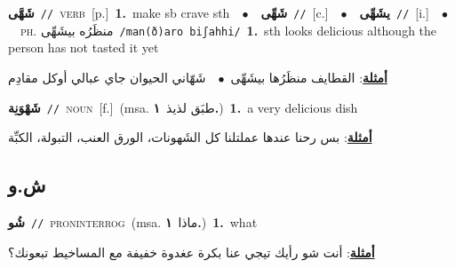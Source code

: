 \documentclass[10pt,a4paper,twoside]{article} %
\begin{document}
\begin{multicols}{2}
{\setlength\topsep{0pt}\textbf{\foreignlanguage{arabic}{شَهَّى}}\ {\color{gray}\texttt{//}\color{black}}\ \textsc{verb}\ [p.]\ \textbf{1.}~make sb crave sth\ \ $\bullet$\ \ \setlength\topsep{0pt}\textbf{\foreignlanguage{arabic}{شَهِّى}}\ {\color{gray}\texttt{//}\color{black}}\ [c.]\ \ $\bullet$\ \ \setlength\topsep{0pt}\textbf{\foreignlanguage{arabic}{يشَهِّى}}\ {\color{gray}\texttt{//}\color{black}}\ [i.]\ \ $\bullet$\ \ \textsc{ph.} \color{gray} \foreignlanguage{arabic}{منظَرُه بيشَهِّى}\color{black}\ {\color{gray}\texttt{/{\sffamily man(ð)aro biʃahhi}/}\color{black}}\ \textbf{1.}~sth looks delicious although the person has not tasted it yet\  \begin{flushright}\color{gray}\foreignlanguage{arabic}{\textbf{\underline{\foreignlanguage{arabic}{أمثلة}}}: القطايف منظَرُها بيشَهِّى\ $\bullet$\ \  شَهّاني الحيوان جاي عبالي أوكل مقادِم}\end{flushright}\color{black}} \vspace{2mm}

{\setlength\topsep{0pt}\textbf{\foreignlanguage{arabic}{شَهْوَنِة}}\ {\color{gray}\texttt{//}\color{black}}\ \textsc{noun}\ [f.]\ \color{gray}(msa. \foreignlanguage{arabic}{طبَق لذيذ}~\foreignlanguage{arabic}{\textbf{١.}})\color{black}\ \textbf{1.}~a very delicious dish\  \begin{flushright}\color{gray}\foreignlanguage{arabic}{\textbf{\underline{\foreignlanguage{arabic}{أمثلة}}}: بس رحنا عندها عملتلنا كل الشَهونات، الورق العنب، التبولة، الكبِّة}\end{flushright}\color{black}} \vspace{2mm}

\vspace{-3mm}
\subsection*{\color{blue}\foreignlanguage{arabic}{ش.و}\color{blue}{}} 

{\setlength\topsep{0pt}\textbf{\foreignlanguage{arabic}{شُو}}\ {\color{gray}\texttt{//}\color{black}}\ \textsc{pron\textunderscore interrog}\ \color{gray}(msa. \foreignlanguage{arabic}{ماذا}~\foreignlanguage{arabic}{\textbf{١.}})\color{black}\ \textbf{1.}~what\  \begin{flushright}\color{gray}\foreignlanguage{arabic}{\textbf{\underline{\foreignlanguage{arabic}{أمثلة}}}: أنت شو رأيك تيجي عنا بكرة عغدوة خفيفة مع المساخيط تبعونك؟}\end{flushright}\color{black}} \vspace{2mm}


\end{multicols}
\end{document}
